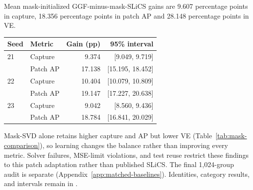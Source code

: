Mean mask-initialized GGF-minus-mask-SLiCS gains are 9.607 percentage points in capture, 18.356 percentage points in patch AP and 28.148 percentage points in VE.
\begin{agfresulttable}
\caption{Mask-initialized GGF minus mask-SLiCS: paired image intervals.}\label{tab:mask-gains}
\begin{tabular}{@{}llrr@{}}
\toprule
Seed & Metric & Gain (pp) & 95\% interval \\
\midrule
21 & Capture & 9.374 & [9.049, 9.719] \\
 & Patch AP & 17.138 & [15.195, 18.452] \\
22 & Capture & 10.404 & [10.079, 10.809] \\
 & Patch AP & 19.147 & [17.227, 20.638] \\
23 & Capture & 9.042 & [8.560, 9.436] \\
 & Patch AP & 18.784 & [16.841, 20.029] \\
\bottomrule
\end{tabular}

\end{agfresulttable}

Mask-SVD alone retains higher capture and AP but lower VE
(Table~\ref{tab:mask-comparison}), so learning changes the balance rather than
improving every metric. Solver failures, MSE-limit violations, and test reuse
restrict these findings to this patch adaptation rather than published SLiCS. The final 1,024-group audit
is separate (Appendix~\ref{app:matched-baselines}). Identities, category results, and
intervals remain in .
